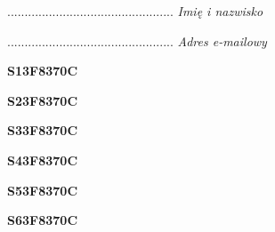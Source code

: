 \begin{turn}{90}\begin{minipage}{\linewidth} \vspace{20mm} ................................................  \textit{Imię i nazwisko}\end{minipage}\end{turn}

\begin{turn}{90}\begin{minipage}{\linewidth} \vspace{20mm} ................................................  \textit{Adres e-mailowy}\end{minipage}\end{turn}

\begin{turn}{90}\huge \begin{minipage}{\linewidth} \vspace{10mm}\textbf{S13F8370C}\end{minipage}\end{turn}

\begin{turn}{90}\huge \begin{minipage}{\linewidth} \vspace{10mm}\textbf{S23F8370C}\end{minipage}\end{turn}

\begin{turn}{90}\huge \begin{minipage}{\linewidth} \vspace{10mm}\textbf{S33F8370C}\end{minipage}\end{turn}

\begin{turn}{90}\huge \begin{minipage}{\linewidth} \vspace{10mm}\textbf{S43F8370C}\end{minipage}\end{turn}

\begin{turn}{90}\huge \begin{minipage}{\linewidth} \vspace{10mm}\textbf{S53F8370C}\end{minipage}\end{turn}

\begin{turn}{90}\huge \begin{minipage}{\linewidth} \vspace{10mm}\textbf{S63F8370C}\end{minipage}\end{turn}

